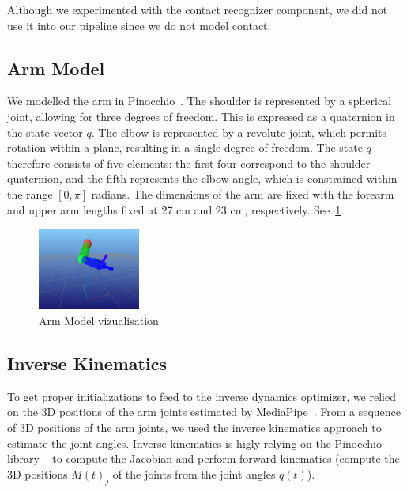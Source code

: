 Although we experimented with the contact recognizer component, we did not use it into our pipeline since we do not model contact.

\subsection{Arm Model}
\label{subsec:arm_model}
We modelled the arm in Pinocchio~\cite{carpentier2019pinocchio}. The shoulder is represented by a spherical joint, allowing for three degrees 
of freedom. This is expressed as a quaternion in the state vector \(q\). The elbow is represented by a revolute joint, which permits rotation 
within a plane, resulting in a single degree of freedom. The state \(q\) therefore consists of five elements: the first four correspond to the 
shoulder quaternion, and the fifth represents the elbow angle, which is constrained within the range \([0, \pi]\) radians. The dimensions of 
the arm are fixed with the forearm and upper arm lengths fixed at 27 cm and 23 cm, respectively. See~\cref{fig:arm_model}

\begin{figure}
    \centering
    \includegraphics[width=0.3\textwidth]{figures/live_arm.png}
    \caption{Arm Model vizualisation}
    \label{fig:arm_model}
\end{figure}

\subsection{Inverse Kinematics}
\label{subsec:inverse_kinematics}
To get proper initializations to feed to the inverse dynamics optimizer, we relied on the 3D positions of the arm joints estimated by MediaPipe~\cite{lugaresi2019mediapipe}.
From a sequence of 3D positions of the arm joints, we used the inverse kinematics approach to estimate the joint angles.
Inverse kinematics is higly relying on the Pinocchio library ~\cite{carpentier2019pinocchio} to compute 
the Jacobian and perform forward kinematics (compute the 3D positions  $M(t)_{j}$ of the joints from the joint angles $q(t)$).

